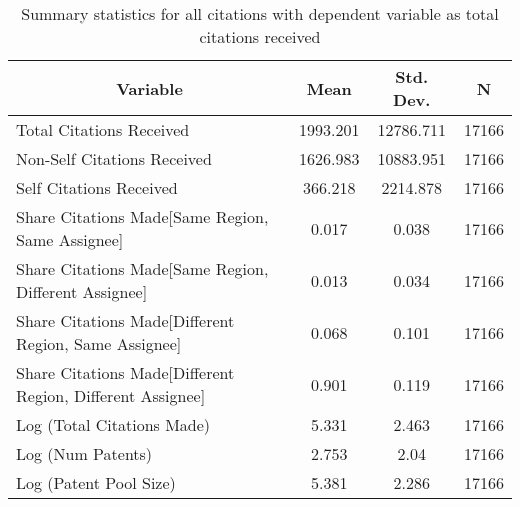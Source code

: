 
\begin{table}[htbp]\centering \caption{Summary statistics for all citations with dependent variable as total citations received \label{a.e.o.t.n.tsummary}}
\begin{tabular}{l c c  c}\hline\hline
\multicolumn{1}{c}{\textbf{Variable}} & \textbf{Mean}
 & \textbf{Std. Dev.} & \textbf{N}\\ \hline
Total Citations Received & 1993.201 & 12786.711  & 17166\\
Non-Self Citations Received & 1626.983 & 10883.951  & 17166\\
Self Citations Received & 366.218 & 2214.878  & 17166\\
Share Citations Made[Same Region, Same Assignee] & 0.017 & 0.038  & 17166\\
Share Citations Made[Same Region, Different Assignee] & 0.013 & 0.034  & 17166\\
Share Citations Made[Different Region, Same Assignee] & 0.068 & 0.101  & 17166\\
Share Citations Made[Different Region, Different Assignee] & 0.901 & 0.119  & 17166\\
Log (Total Citations Made) & 5.331 & 2.463  & 17166\\
Log (Num Patents) & 2.753 & 2.04  & 17166\\
Log (Patent Pool Size) & 5.381 & 2.286  & 17166\\
\hline\end{tabular}
\end{table}
